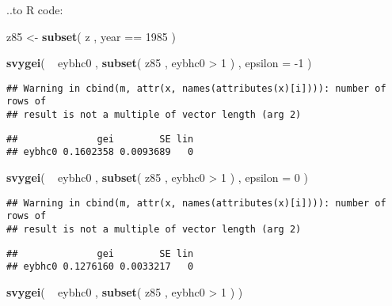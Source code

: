 \documentclass[]{book}
\newenvironment{Shaded}{\begin{snugshade}}{\end{snugshade}}
\newcommand{\KeywordTok}[1]{\textcolor[rgb]{0.13,0.29,0.53}{\textbf{{#1}}}}
\newcommand{\DataTypeTok}[1]{\textcolor[rgb]{0.13,0.29,0.53}{{#1}}}
\newcommand{\DecValTok}[1]{\textcolor[rgb]{0.00,0.00,0.81}{{#1}}}
\newcommand{\StringTok}[1]{\textcolor[rgb]{0.31,0.60,0.02}{{#1}}}
\newcommand{\NormalTok}[1]{{#1}}
\begin{document}
..to R code:

\begin{Shaded}
\begin{Highlighting}[]
\NormalTok{z85 <-}\StringTok{ }\KeywordTok{subset}\NormalTok{( z , year ==}\StringTok{ }\DecValTok{1985} \NormalTok{)}

\KeywordTok{svygei}\NormalTok{( ~}\StringTok{ }\NormalTok{eybhc0 , }\KeywordTok{subset}\NormalTok{( z85 , eybhc0 >}\StringTok{ }\DecValTok{1} \NormalTok{) , }\DataTypeTok{epsilon =} \NormalTok{-}\DecValTok{1} \NormalTok{)}
\end{Highlighting}
\end{Shaded}

\begin{verbatim}
## Warning in cbind(m, attr(x, names(attributes(x)[i]))): number of rows of
## result is not a multiple of vector length (arg 2)
\end{verbatim}

\begin{verbatim}
##              gei        SE lin
## eybhc0 0.1602358 0.0093689   0
\end{verbatim}

\begin{Shaded}
\begin{Highlighting}[]
\KeywordTok{svygei}\NormalTok{( ~}\StringTok{ }\NormalTok{eybhc0 , }\KeywordTok{subset}\NormalTok{( z85 , eybhc0 >}\StringTok{ }\DecValTok{1} \NormalTok{) , }\DataTypeTok{epsilon =} \DecValTok{0} \NormalTok{)}
\end{Highlighting}
\end{Shaded}

\begin{verbatim}
## Warning in cbind(m, attr(x, names(attributes(x)[i]))): number of rows of
## result is not a multiple of vector length (arg 2)
\end{verbatim}

\begin{verbatim}
##              gei        SE lin
## eybhc0 0.1276160 0.0033217   0
\end{verbatim}

\begin{Shaded}
\begin{Highlighting}[]
\KeywordTok{svygei}\NormalTok{( ~}\StringTok{ }\NormalTok{eybhc0 , }\KeywordTok{subset}\NormalTok{( z85 , eybhc0 >}\StringTok{ }\DecValTok{1} \NormalTok{) )}
\end{Highlighting}
\end{Shaded}
\end{document}
